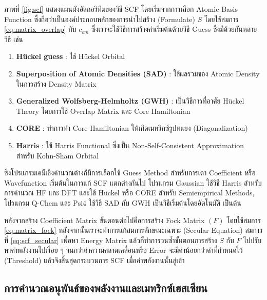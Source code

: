 ภาพที่ \ref{fig:scf} แสดงแผนผังอัลกอริทึมของวิธี SCF โดยเริ่มจากการเลือก Atomic Basis Function ซึ่งถือว่าเป็นองค์ประกอบหลักของการนำไปสร้าง (Formulate) $S$ โดยใช้สมการ \eqref{eq:matrix_overlap} กับ $c_{om}$ ซึ่งเราจะใช้วิธีการสร้างค่าเริ่มต้นด้วยวิธี Guess ซึ่งมีด้วยกันหลายวิธี เช่น
%
\begin{enumerate}[topsep=0pt,noitemsep]\setlength\itemsep{0.5em}
    \item \textbf{H{\"u}ckel guess} : ใช้ H{\"u}ckel Orbital\autocite{jensen2017}

    \item \textbf{Superposition of Atomic Densities (SAD)} : ใช้ผลรวมของ Atomic Density ในการสร้าง Density Matrix

    \item \textbf{Generalized Wolfsberg-Helmholtz (GWH)} : เป็นวิธีการที่อาศัย H{\"u}ckel Theory โดยการใช้ Overlap Matrix และ Core Hamiltonian\autocite{wolfsberg1952}

    \item \textbf{CORE} : ทำการทำ Core Hamiltonian ให้เกิดเมทริกซ์รูปทแยง (Diagonalization)

    \item \textbf{Harris} : ใช้ Harris Functional ซึ่งเป็น Non-Self-Consistent Approximation สำหรับ Kohn-Sham Orbital\autocite{harris1985}
\end{enumerate}

ซึ่งโปรแกรมเคมีเชิงคำนวณต่างก็มีการเลือกใช้ Guess Method สำหรับการเดา Coefficient หรือ Wavefunction เริ่มต้นในการแก้ SCF แตกต่างกันไป โปรแกรม Gaussian ใช้วิธี Harris สำหรับการคำนวณ HF และ DFT และใช้ H{\"u}ckel หรือ CORE สำหรับ Semiempirical Methods, โปรแกรม Q-Chem และ Psi4 ใช้วิธี SAD กับ GWH เป็นวิธีเริ่มต้นโดยอัตโนมัติ เป็นต้น

หลังจากสร้าง Coefficient Matrix ขั้นตอนต่อไปคือการสร้าง Fock Matrix $(F)$ โดยใช้สมการ \eqref{eq:matrix_fock} หลังจากนั้นเราจะทำการแก้สมการลักษณะเฉพาะ (Secular Equation) สมการที่ \eqref{eq:scf_secular} เพื่อหา Energy Matrix แล้วก็ทำการวนซ้ำขั้นตอนการสร้าง $S$ กับ $F$ ไปปรับหาค่าพลังงานไปเรื่อย ๆ จนกว่าค่าความคลาดเคลื่อนหรือ Error จะมีค่าน้อยกว่าค่าที่กำหนดไว้ (Threshold) แล้วจึงสิ้นสุดกระบวนการ SCF เมื่อค่าพลังงานนั้นลู่เข้า

\subsection{การคำนวณอนุพันธ์ของพลังงานและเมทริกซ์เฮสเซียน}
\label{ssec:ener_der}

